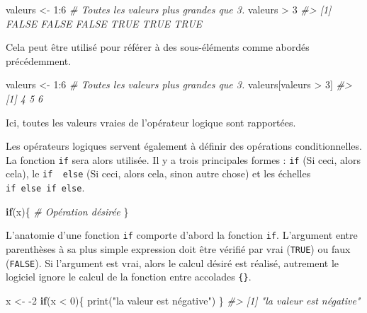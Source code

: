 \documentclass[
]{book}
\newenvironment{Shaded}{}{}
\newcommand{\CommentTok}[1]{\textit{#1}}
\newcommand{\ControlFlowTok}[1]{\textbf{#1}}
\newcommand{\DecValTok}[1]{#1}
\newcommand{\FunctionTok}[1]{#1}
\newcommand{\NormalTok}[1]{#1}
\newcommand{\OtherTok}[1]{#1}
\newcommand{\SpecialCharTok}[1]{#1}
\newcommand{\StringTok}[1]{#1}
\begin{document}
\begin{Shaded}
\begin{Highlighting}[]
\NormalTok{valeurs }\OtherTok{\textless{}{-}} \DecValTok{1}\SpecialCharTok{:}\DecValTok{6}
\CommentTok{\# Toutes les valeurs plus grandes que 3.}
\NormalTok{valeurs }\SpecialCharTok{\textgreater{}} \DecValTok{3}
\CommentTok{\#\textgreater{} [1] FALSE FALSE FALSE  TRUE  TRUE  TRUE}
\end{Highlighting}
\end{Shaded}

Cela peut être utilisé pour référer à des sous-éléments comme abordés précédemment.

\begin{Shaded}
\begin{Highlighting}[]
\NormalTok{valeurs }\OtherTok{\textless{}{-}} \DecValTok{1}\SpecialCharTok{:}\DecValTok{6}
\CommentTok{\# Toutes les valeurs plus grandes que 3.}
\NormalTok{valeurs[valeurs }\SpecialCharTok{\textgreater{}} \DecValTok{3}\NormalTok{]}
\CommentTok{\#\textgreater{} [1] 4 5 6}
\end{Highlighting}
\end{Shaded}

Ici, toutes les valeurs vraies de l'opérateur logique sont rapportées.

Les opérateurs logiques servent également à définir des opérations conditionnelles. La fonction \texttt{if} sera alors utilisée. Il y a trois principales formes : \texttt{if} (Si ceci, alors cela), le \texttt{if\ \ else} (Si ceci, alors cela, sinon autre chose) et les échelles \texttt{if\ else\ if\ else}.

\begin{Shaded}
\begin{Highlighting}[]
\ControlFlowTok{if}\NormalTok{(x)\{}
  \CommentTok{\# Opération désirée}
\NormalTok{\}}
\end{Highlighting}
\end{Shaded}

L'anatomie d'une fonction \texttt{if} comporte d'abord la fonction \texttt{if}. L'argument entre parenthèses à sa plus simple expression doit être vérifié par vrai (\texttt{TRUE}) ou faux (\texttt{FALSE}). Si l'argument est vrai, alors le calcul désiré est réalisé, autrement le logiciel ignore le calcul de la fonction entre accolades \texttt{\{\}}.

\begin{Shaded}
\begin{Highlighting}[]
\NormalTok{x }\OtherTok{\textless{}{-}} \SpecialCharTok{{-}}\DecValTok{2}
\ControlFlowTok{if}\NormalTok{(x }\SpecialCharTok{\textless{}} \DecValTok{0}\NormalTok{)\{}
  \FunctionTok{print}\NormalTok{(}\StringTok{"la valeur est négative"}\NormalTok{)}
\NormalTok{\}}
\CommentTok{\#\textgreater{} [1] "la valeur est négative"}
\end{Highlighting}
\end{Shaded}
\end{document}
